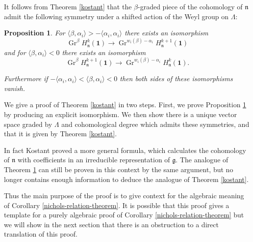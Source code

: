 \documentclass[11pt,letterpaper]{article}
\newtheorem{prop}[theorem]{Proposition}
\theoremstyle{definition}
\theoremstyle{remark}
\numberwithin{equation}{section}
\theoremstyle{dotless}
\newcommand{\Gr}{\operatorname{Gr}}
\newcommand{\LieH}{H}
\begin{document}
It follows from Theorem \ref{kostant} that the $\beta$-graded piece of the cohomology of $\mathfrak n$ admit the following symmetry under a shifted action of the Weyl group on $\Lambda$:


 \begin{prop}\label{kostant-fe} For  $\langle \beta, \alpha_i  \rangle > - \langle \alpha_i, \alpha_i \rangle $ there exists an isomorphism
 \[ \Gr^\beta \LieH^{k}_{\mathfrak n} ( \mathbf 1)  \to   \Gr^{w_i(\beta)-\alpha_i} \LieH^{k+1}_{\mathfrak n} ( \mathbf 1) \]
 and for $\langle \beta, \alpha_i \rangle < 0$ there exists an isomorphism 
\[ \Gr^{\beta} \LieH^{k+1}_{\mathfrak n} ( \mathbf 1)   \to \Gr^{ w_i(\beta)- \alpha_i}  \LieH^{k}_{\mathfrak n} ( \mathbf 1).    \]

Furthermore if $- \langle \alpha_i, \alpha_i \rangle <\langle \beta, \alpha_i \rangle < 0 $ then both sides of these isomorphisms vanish.

\end{prop}



We give a proof of Theorem \ref{kostant}  in two steps. First, we prove Proposition \ref{kostant-fe} by producing an explicit isomorphism. We then show there is a unique vector space graded by $\Lambda$ and cohomological degree which admits these symmetries, and that it is given by Theorem \ref{kostant}.

In fact Kostant proved a more general formula, which calculates the cohomology of $\mathfrak n$ with coefficients in an irreducible representation of $\mathfrak g$. The analogue of Theorem \ref{kostant-fe} can still be proven in this context by the same argument, but no longer contains enough information to deduce the analogue of Theorem \ref{kostant}.

Thus the main purpose of the proof is to give context for the algebraic meaning of Corollary \ref{nichols-relation-theorem}. It is possible that this proof gives a template for a purely algebraic proof of Corollary \ref{nichols-relation-theorem} but we will show in the next section that there is an obstruction to a direct translation of this proof.
\end{document}
